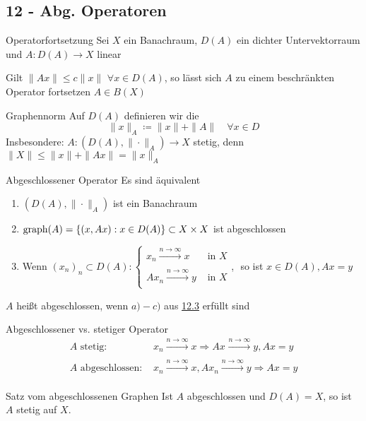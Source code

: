 \subsection*{12 - Abg. Operatoren}

	\begin{karte}{Operatorfortsetzung}
		Sei $X$ ein Banachraum, $D(A)$ ein dichter Untervektorraum und $A: D(A) \rightarrow X$ linear
	
		Gilt $\| A x \| \leq c \| x \|$ $\forall x \in D(A)$, so lässt sich $A$ zu einem beschränkten Operator fortsetzen $A \in B(X)$	
	\end{karte}
	


	\begin{karte}{Graphennorm}
		Auf $D(A)$ definieren wir die 
		\[ \| x \|_{A} \coloneqq \|x \| + \| A \| \quad \forall x \in D \]
		Insbesondere: $A: (D(A), \| \cdot \|_{A}) \rightarrow X$ stetig, denn $\| X \| \leq \|x \| + \| A x \| = \| x \|_{A}$
	\end{karte}


	\begin{karte}{Abgeschlossener Operator}
		Es sind äquivalent
		\begin{enumerate}[label=\alph*\upshape)]
			\item $\left( D(A), \| \cdot \|_{A} \right)$ ist ein Banachraum
			\item $\operatorname{graph}(A) = \{ (x, A x): x \in D(A) \} \subset X \times X$ ist abgeschlossen
			\item Wenn $(x_{n})_{n} \subset D(A): \begin{cases}
			x_{n} \xrightarrow[]{n \rightarrow \infty} x & \text{ in } X \\ A x_{n} \xrightarrow[]{n \rightarrow \infty} y & \text{ in } X \end{cases}$, $ $ so ist $x \in D(A), A x = y$
		\end{enumerate}
	
		$A$ hei{\ss}t abgeschlossen, wenn $a) - c)$ aus \hyperref[satz:12.3]{12.3} erfüllt sind	
	\end{karte}


	\begin{karte}{Abgeschlossener vs. stetiger Operator}
		\begin{align*}
			A \text{ stetig: } & x_{n} \xrightarrow[]{n \rightarrow \infty} x \Rightarrow Ax_{} \xrightarrow[]{n \rightarrow \infty} y, Ax = y \\
			A \text{ abgeschlossen: } & x_{n} \xrightarrow[]{n \rightarrow \infty} x, A x_{n} \xrightarrow[]{n \rightarrow \infty} y \Rightarrow Ax = y
		\end{align*}
	\end{karte}


	\begin{karte}{Satz vom abgeschlossenen Graphen}
		Ist $A$ abgeschlossen und $D(A) = X$, so ist $A$ stetig auf $X$.
	\end{karte}
